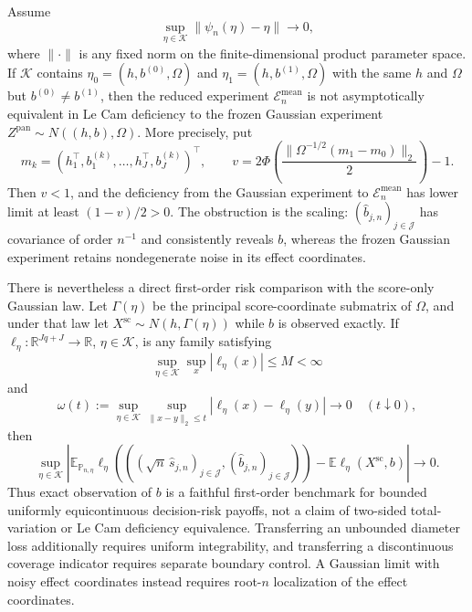 Assume
\[
 \sup_{\eta\in\mathcal K}\lVert\psi_n(\eta)-\eta\rVert\longrightarrow0,
\]
where \(\lVert\cdot\rVert\) is any fixed norm on the finite-dimensional product parameter space.
If \(\mathcal K\) contains \(\eta_0=(h,b^{(0)},\Omega)\) and \(\eta_1=(h,b^{(1)},\Omega)\) with the same \(h\) and \(\Omega\) but \(b^{(0)}\ne b^{(1)}\), then the reduced experiment \(\mathcal E_n^{\mathrm{mean}}\) is not asymptotically equivalent in Le Cam deficiency to the frozen Gaussian experiment \(Z^{\mathrm{pan}}\sim N((h,b),\Omega)\). More precisely, put
\[
 m_k=(h_1^{\top},b^{(k)}_1,\ldots,h_J^{\top},b^{(k)}_J)^{\top},
 \qquad
 v=2\Phi\!\left(\frac{\lVert\Omega^{-1/2}(m_1-m_0)\rVert_2}{2}\right)-1.
\]
Then \(v<1\), and the deficiency from the Gaussian experiment to \(\mathcal E_n^{\mathrm{mean}}\) has lower limit at least \((1-v)/2>0\). The obstruction is the scaling: \((\widehat b_{j,n})_{j\in\mathcal J}\) has covariance of order \(n^{-1}\) and consistently reveals \(b\), whereas the frozen Gaussian experiment retains nondegenerate noise in its effect coordinates.

There is nevertheless a direct first-order risk comparison with the score-only Gaussian law. Let \(\Gamma(\eta)\) be the principal score-coordinate submatrix of \(\Omega\), and under that law let \(X^{\mathrm{sc}}\sim N(h,\Gamma(\eta))\) while \(b\) is observed exactly. If \(\ell_\eta:\mathbb R^{Jq+J}\to\mathbb R\), \(\eta\in\mathcal K\), is any family satisfying
\[
 \sup_{\eta\in\mathcal K}\sup_x|\ell_\eta(x)|\leq M<\infty
\]
and
\[
 \omega(t):=
 \sup_{\eta\in\mathcal K}
 \sup_{\lVert x-y\rVert_2\leq t}
 |\ell_\eta(x)-\ell_\eta(y)|
 \longrightarrow0
 \quad(t\downarrow0),
\]
then
\[
 \sup_{\eta\in\mathcal K}
 \left|
 \mathbb E_{\mathbb P_{n,\eta}}
 \ell_\eta\!\left(((\sqrt n\,\widehat s_{j,n})_{j\in\mathcal J},
                    (\widehat b_{j,n})_{j\in\mathcal J})\right)
 -
 \mathbb E\ell_\eta(X^{\mathrm{sc}},b)
 \right|
 \longrightarrow0.
\]
Thus exact observation of \(b\) is a faithful first-order benchmark for bounded uniformly equicontinuous decision-risk payoffs, not a claim of two-sided total-variation or Le Cam deficiency equivalence. Transferring an unbounded diameter loss additionally requires uniform integrability, and transferring a discontinuous coverage indicator requires separate boundary control. A Gaussian limit with noisy effect coordinates instead requires root-\(n\) localization of the effect coordinates.

